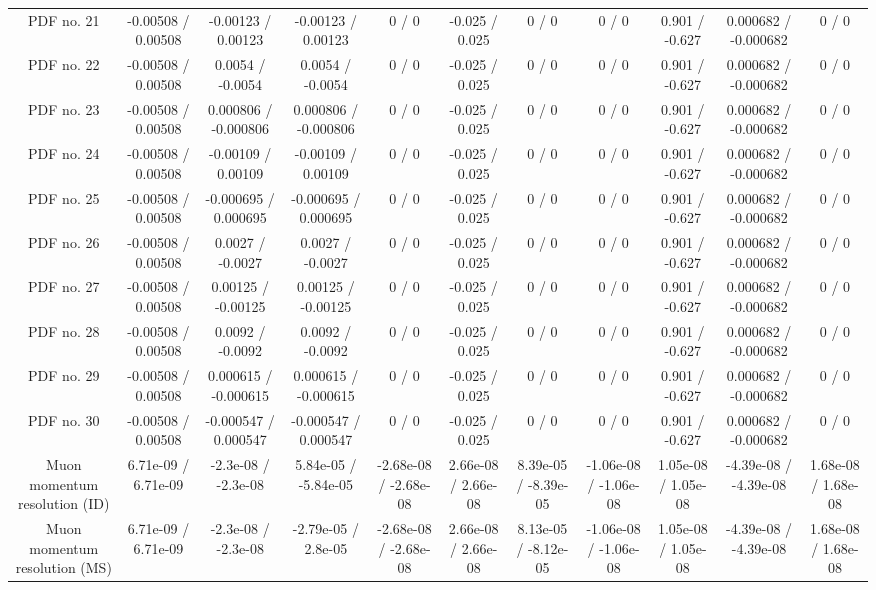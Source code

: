 \begin{table}[htbp]
\begin{center}
\begin{tabular}{|c|c|c|c|c|c|c|c|c|c|c|}
  PDF no. 21 & -0.00508 / 0.00508 & -0.00123 / 0.00123 & -0.00123 / 0.00123 & 0 / 0 & -0.025 / 0.025 & 0 / 0 & 0 / 0 & 0.901 / -0.627 & 0.000682 / -0.000682 & 0 / 0 \\ 
  PDF no. 22 & -0.00508 / 0.00508 & 0.0054 / -0.0054 & 0.0054 / -0.0054 & 0 / 0 & -0.025 / 0.025 & 0 / 0 & 0 / 0 & 0.901 / -0.627 & 0.000682 / -0.000682 & 0 / 0 \\ 
  PDF no. 23 & -0.00508 / 0.00508 & 0.000806 / -0.000806 & 0.000806 / -0.000806 & 0 / 0 & -0.025 / 0.025 & 0 / 0 & 0 / 0 & 0.901 / -0.627 & 0.000682 / -0.000682 & 0 / 0 \\ 
  PDF no. 24 & -0.00508 / 0.00508 & -0.00109 / 0.00109 & -0.00109 / 0.00109 & 0 / 0 & -0.025 / 0.025 & 0 / 0 & 0 / 0 & 0.901 / -0.627 & 0.000682 / -0.000682 & 0 / 0 \\ 
  PDF no. 25 & -0.00508 / 0.00508 & -0.000695 / 0.000695 & -0.000695 / 0.000695 & 0 / 0 & -0.025 / 0.025 & 0 / 0 & 0 / 0 & 0.901 / -0.627 & 0.000682 / -0.000682 & 0 / 0 \\ 
  PDF no. 26 & -0.00508 / 0.00508 & 0.0027 / -0.0027 & 0.0027 / -0.0027 & 0 / 0 & -0.025 / 0.025 & 0 / 0 & 0 / 0 & 0.901 / -0.627 & 0.000682 / -0.000682 & 0 / 0 \\ 
  PDF no. 27 & -0.00508 / 0.00508 & 0.00125 / -0.00125 & 0.00125 / -0.00125 & 0 / 0 & -0.025 / 0.025 & 0 / 0 & 0 / 0 & 0.901 / -0.627 & 0.000682 / -0.000682 & 0 / 0 \\ 
  PDF no. 28 & -0.00508 / 0.00508 & 0.0092 / -0.0092 & 0.0092 / -0.0092 & 0 / 0 & -0.025 / 0.025 & 0 / 0 & 0 / 0 & 0.901 / -0.627 & 0.000682 / -0.000682 & 0 / 0 \\ 
  PDF no. 29 & -0.00508 / 0.00508 & 0.000615 / -0.000615 & 0.000615 / -0.000615 & 0 / 0 & -0.025 / 0.025 & 0 / 0 & 0 / 0 & 0.901 / -0.627 & 0.000682 / -0.000682 & 0 / 0 \\ 
  PDF no. 30 & -0.00508 / 0.00508 & -0.000547 / 0.000547 & -0.000547 / 0.000547 & 0 / 0 & -0.025 / 0.025 & 0 / 0 & 0 / 0 & 0.901 / -0.627 & 0.000682 / -0.000682 & 0 / 0 \\ 
  Muon momentum resolution (ID) & 6.71e-09 / 6.71e-09 & -2.3e-08 / -2.3e-08 & 5.84e-05 / -5.84e-05 & -2.68e-08 / -2.68e-08 & 2.66e-08 / 2.66e-08 & 8.39e-05 / -8.39e-05 & -1.06e-08 / -1.06e-08 & 1.05e-08 / 1.05e-08 & -4.39e-08 / -4.39e-08 & 1.68e-08 / 1.68e-08 \\ 
  Muon momentum resolution (MS) & 6.71e-09 / 6.71e-09 & -2.3e-08 / -2.3e-08 & -2.79e-05 / 2.8e-05 & -2.68e-08 / -2.68e-08 & 2.66e-08 / 2.66e-08 & 8.13e-05 / -8.12e-05 & -1.06e-08 / -1.06e-08 & 1.05e-08 / 1.05e-08 & -4.39e-08 / -4.39e-08 & 1.68e-08 / 1.68e-08 \\ 

\end{tabular}
\end{center}
\end{table}
